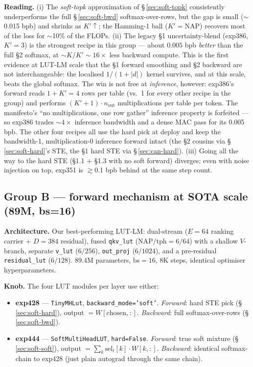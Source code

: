 \documentclass[11pt]{article}
\begin{document}
\textbf{Reading.}
(i) The \emph{soft-topk} approximation of \S\,\ref{sec:soft-topk} consistently
underperforms the full \S\,\ref{sec:soft-bwd} softmax-over-rows, but the gap
is small ($\sim$0.015 bpb) and shrinks as $K'\!\uparrow$; the Hamming-1 ball
($K'{=}\mathrm{NAP}$) recovers most of the loss for $\sim$10\% of the FLOPs.
(ii) The legacy \S1 uncertainty-blend (exp386, $K'{=}3$) is the strongest
recipe in this group --- about $0.005$ bpb \emph{better} than the full
\S2 softmax, at $\sim K/K'{\sim}16\times$ less backward compute. This is the
first evidence at LUT-LM scale that the \S1 forward smoothing and
\S2 backward are not interchangeable: the localised
$1/(1{+}|d|)$ kernel survives, and at this scale, beats the global softmax.
The win is not free at \emph{inference}, however: exp386's forward reads
$1{+}K'{=}4$ rows per table (vs.\ 1 for every other recipe in the group)
and performs $(K'{+}1)\cdot n_{\mathrm{out}}$ multiplications per table per
token. The manifesto's ``no multiplications, one row gather'' inference
property is forfeited --- so exp386 trades $\sim 4\times$ inference
bandwidth and a dense MAC pass for its 0.005 bpb. The other four recipes
all use the hard pick at deploy and keep the bandwidth-1, multiplication-0
inference forward intact (the \S2 cousins via \S\,\ref{sec:soft-hard}'s
STE, the \S1 hard STE via \S\,\ref{sec:can-hard}).
(iii) Going all the way to the hard STE (\S1.1 + \S1.3 with no soft forward)
diverges; even with noise injection on top, exp351 is $\gtrsim$0.1 bpb behind
at the same step count.

\subsection{Group B --- forward mechanism at SOTA scale (89M, bs=16)}
\label{sec:expB}

\textbf{Architecture.} Our best-performing LUT-LM: dual-stream
($E{=}64$ ranking carrier + $D{=}384$ residual), fused
\texttt{qkv\_lut} (NAP$/$tph${=}6/64$) with a shallow $V$-branch,
separate \texttt{v\_lut} ($6/256$), \texttt{out\_proj} ($6/1024$),
and a pre-residual \texttt{residual\_lut} ($6/128$). 89.4M parameters,
$\text{bs}{=}16$, 8K steps, identical optimiser hyperparameters.

\textbf{Knob.} The four LUT modules per layer use either:

\begin{itemize}\itemsep0pt
\item \textbf{exp428} --- \texttt{TinyMHLut}, \texttt{backward\_mode='soft'}.
  \emph{Forward}: hard STE pick (\S\,\ref{sec:soft-hard}), output $= W[\text{chosen}, :]$.
  \emph{Backward}: full softmax-over-rows (\S\,\ref{sec:soft-bwd}).
\item \textbf{exp444} --- \texttt{SoftMultiHeadLUT}, \texttt{hard=False}.
  \emph{Forward}: true soft mixture (\S\,\ref{sec:soft-soft}),
  output $= \sum_k \mathrm{sel}_t[k] \cdot W[k,:]$.
  \emph{Backward}: identical softmax-chain to exp428 (just plain autograd
  through the same chain).
\end{itemize}
\end{document}
